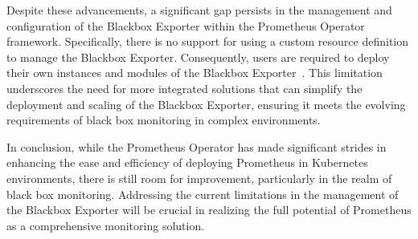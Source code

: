 Despite these advancements, a significant gap persists in the management and configuration of the Blackbox Exporter within the Prometheus Operator framework. Specifically, there is no support for using a custom resource definition to manage the Blackbox Exporter. Consequently, users are required to deploy their own instances and modules of the Blackbox Exporter~\parencite{prometheusBlackboxExporter2023}. This limitation underscores the need for more integrated solutions that can simplify the deployment and scaling of the Blackbox Exporter, ensuring it meets the evolving requirements of black box monitoring in complex environments. 

In conclusion, while the Prometheus Operator has made significant strides in enhancing the ease and efficiency of deploying Prometheus in Kubernetes environments, there is still room for improvement, particularly in the realm of black box monitoring. Addressing the current limitations in the management of the Blackbox Exporter will be crucial in realizing the full potential of Prometheus as a comprehensive monitoring solution. 